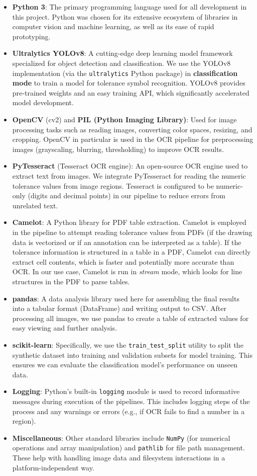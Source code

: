 \documentclass[11pt,a4paper]{article}
\begin{document}
\begin{itemize}
  \item \textbf{Python 3}: The primary programming language used for all development in this project. Python was chosen for its extensive ecosystem of libraries in computer vision and machine learning, as well as its ease of rapid prototyping.
  \item \textbf{Ultralytics YOLOv8}: A cutting-edge deep learning model framework specialized for object detection and classification. We use the YOLOv8 implementation (via the \verb|ultralytics| Python package) in \textbf{classification mode} to train a model for tolerance symbol recognition. YOLOv8 provides pre-trained weights and an easy training API, which significantly accelerated model development.
  \item \textbf{OpenCV} (cv2) and \textbf{PIL (Python Imaging Library)}: Used for image processing tasks such as reading images, converting color spaces, resizing, and cropping. OpenCV in particular is used in the OCR pipeline for preprocessing images (grayscaling, blurring, thresholding) to improve OCR results.
  \item \textbf{PyTesseract} (Tesseract OCR engine): An open-source OCR engine used to extract text from images. We integrate PyTesseract for reading the numeric tolerance values from image regions. Tesseract is configured to be numeric-only (digits and decimal points) in our pipeline to reduce errors from unrelated text.
  \item \textbf{Camelot}: A Python library for PDF table extraction. Camelot is employed in the pipeline to attempt reading tolerance values from PDFs (if the drawing data is vectorized or if an annotation can be interpreted as a table). If the tolerance information is structured in a table in a PDF, Camelot can directly extract cell contents, which is faster and potentially more accurate than OCR. In our use case, Camelot is run in \emph{stream} mode, which looks for line structures in the PDF to parse tables.
  \item \textbf{pandas}: A data analysis library used here for assembling the final results into a tabular format (DataFrame) and writing output to CSV. After processing all images, we use pandas to create a table of extracted values for easy viewing and further analysis.
  \item \textbf{scikit-learn}: Specifically, we use the \verb|train_test_split| utility to split the synthetic dataset into training and validation subsets for model training. This ensures we can evaluate the classification model’s performance on unseen data.
  \item \textbf{Logging}: Python’s built-in \verb|logging| module is used to record informative messages during execution of the pipelines. This includes logging steps of the process and any warnings or errors (e.g., if OCR fails to find a number in a region).
  \item \textbf{Miscellaneous}: Other standard libraries include \verb|NumPy| (for numerical operations and array manipulation) and \verb|pathlib| for file path management. These help with handling image data and filesystem interactions in a platform-independent way.
\end{itemize}
\end{document}
